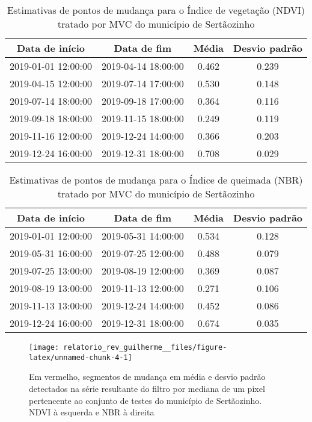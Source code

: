 \documentclass[11pt,brazil,]{article}
\providecommand{\DIFaddbeginFL}{} %
\providecommand{\DIFaddendFL}{} %
\providecommand{\DIFdelbeginFL}{} %
\providecommand{\DIFdelendFL}{} %
\newcommand{\DIFscaledelfig}{0.5}
\newlength{\DIFdelgraphicswidth} %
\newlength{\DIFdelgraphicsheight} %
\newcommand{\DIFaddincludegraphics}[2][]{{\color{blue}\fbox{\DIFOincludegraphics[#1]{#2}}}} %
\newcommand{\DIFdelincludegraphics}[2][]{%
\sbox{\DIFdelgraphicsbox}{\DIFOincludegraphics[#1]{#2}}%
\settoboxwidth{\DIFdelgraphicswidth}{\DIFdelgraphicsbox} %
\settoboxtotalheight{\DIFdelgraphicsheight}{\DIFdelgraphicsbox} %
\scalebox{\DIFscaledelfig}{%
\parbox[b]{\DIFdelgraphicswidth}{\usebox{\DIFdelgraphicsbox}\\[-\baselineskip] \rule{\DIFdelgraphicswidth}{0em}}\llap{\resizebox{\DIFdelgraphicswidth}{\DIFdelgraphicsheight}{%
\setlength{\unitlength}{\DIFdelgraphicswidth}%
\begin{picture}(1,1)%
\thicklines\linethickness{2pt} %
{\color[rgb]{1,0,0}\put(0,0){\framebox(1,1){}}}%
{\color[rgb]{1,0,0}\put(0,0){\line( 1,1){1}}}%
{\color[rgb]{1,0,0}\put(0,1){\line(1,-1){1}}}%
\end{picture}%
}\hspace*{3pt}}} %
} %
\DeclareRobustCommand{\DIFaddbeginFL}{\DIFOaddbeginFL \let\includegraphics\DIFaddincludegraphics} %
\DeclareRobustCommand{\DIFaddendFL}{\DIFOaddendFL \let\includegraphics\DIFOincludegraphics} %
\DeclareRobustCommand{\DIFdelbeginFL}{\DIFOdelbeginFL \let\includegraphics\DIFdelincludegraphics} %
\DeclareRobustCommand{\DIFdelendFL}{\DIFOaddendFL \let\includegraphics\DIFOincludegraphics} %
\begin{document}
\begin{table}[t]

\caption{\label{tab:unnamed-chunk-3}\label{ndvi_mvc}Estimativas de pontos de mudança para o Índice de vegetação (NDVI) tratado por MVC do município de Sertãozinho}
\centering
\begin{tabular}{cccc}
\toprule
Data de início & Data de fim & Média & Desvio padrão\\
\midrule
2019-01-01 12:00:00 & 2019-04-14 18:00:00 & 0.462 & 0.239\\
2019-04-15 12:00:00 & 2019-07-14 17:00:00 & 0.530 & 0.148\\
2019-07-14 18:00:00 & 2019-09-18 17:00:00 & 0.364 & 0.116\\
2019-09-18 18:00:00 & 2019-11-15 18:00:00 & 0.249 & 0.119\\
2019-11-16 12:00:00 & 2019-12-24 14:00:00 & 0.366 & 0.203\\
2019-12-24 16:00:00 & 2019-12-31 18:00:00 & 0.708 & 0.029\\
\bottomrule
\end{tabular}
\end{table}

\begin{table}[t]

\caption{\label{tab:unnamed-chunk-3}\label{nbr_mvc}Estimativas de pontos de mudança para o Índice de queimada (NBR) tratado por MVC do município de Sertãozinho}
\centering
\begin{tabular}{cccc}
\toprule
Data de início & Data de fim & Média & Desvio padrão\\
\midrule
2019-01-01 12:00:00 & 2019-05-31 14:00:00 & 0.534 & 0.128\\
2019-05-31 16:00:00 & 2019-07-25 12:00:00 & 0.488 & 0.079\\
2019-07-25 13:00:00 & 2019-08-19 12:00:00 & 0.369 & 0.087\\
2019-08-19 13:00:00 & 2019-11-13 12:00:00 & 0.271 & 0.106\\
2019-11-13 13:00:00 & 2019-12-24 14:00:00 & 0.452 & 0.086\\
2019-12-24 16:00:00 & 2019-12-31 18:00:00 & 0.674 & 0.035\\
\bottomrule
\end{tabular}
\end{table}

\begin{figure}[H]

{\centering \DIFdelbeginFL %
\DIFdelendFL \DIFaddbeginFL \texttt{[image: relatorio\_rev\_guilherme\_\_files/figure-latex/unnamed-chunk-4-1]} 
\DIFaddendFL 

}

\caption{\label{med} Em vermelho, segmentos de mudança em média e desvio padrão detectados na série resultante do filtro por mediana de um pixel pertencente ao conjunto de testes do município de Sertãozinho. NDVI à esquerda e NBR à direita}\label{fig:unnamed-chunk-4}
\end{figure}
\end{document}

